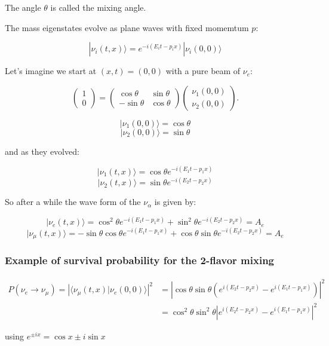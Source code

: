 \documentclass[
  letterpaper,
  DIV=11,
  numbers=noendperiod]{scrreprt}
\begin{document}
The angle \(\theta\) is called the mixing angle.

The mass eigenstates evolve as plane waves with fixed momemtum \(p\):

\[|\nu_{i}(t, x)\rangle = e^{ -i (E_{i} t - p_i x) }|\nu_{i}(0,0)\rangle\]

Let's imagine we start at \((x,t) = (0,0)\) with a pure beam of
\(\nu_e\):

\[\begin{pmatrix} 1 \\ 0 \end{pmatrix} = \begin{pmatrix} \cos\theta & \sin\theta \\ -\sin\theta & \cos\theta \end{pmatrix} \begin{pmatrix} \nu_1(0,0) \\ \nu_2(0,0) \end{pmatrix}.\]

\[|\nu_{1}(0,0)\rangle = \cos \theta\]
\[|\nu_{2}(0,0)\rangle = \sin \theta\]

and as they evolved:

\[|\nu_{1}(t,x)\rangle = \cos \theta e^{ -i (E_{1} t - p_1 x)  }\]
\[|\nu_{2}(t,x)\rangle = \sin \theta e^{ -i (E_{2} t - p_2 x) }\]

So after a while the wave form of the \(\nu_\alpha\) is given by:

\[|\nu_{e}(t, x)\rangle = \cos^2 \theta e^{ -i (E_{1} t - p_1 x)  } + \sin^2 \theta e^{ -i (E_{2} t - p_2 x) } = A_e\]
\[|\nu_{\mu}(t, x)\rangle = -\sin\theta\cos \theta e^{ -i (E_{1} t - p_1 x)  } + \cos\theta\sin \theta e^{ -i (E_{2} t - p_2 x) } = A_e\]

\subsubsection{Example of survival probability for the 2-flavor
mixing}\label{example-of-survival-probability-for-the-2-flavor-mixing}

\[\begin{aligned}
P(\nu_e \rightarrow \nu_\mu) = \left|\langle \nu_{\mu}(t,x)|\nu_{e}(0,0)\rangle\right|^2 &=\left|\cos\theta \sin\theta (e^{i(E_2 t - p_2 x)} - e^{i(E_1 t -p_1 x)})\right|^2\\
&=
\cos^2\theta\sin^2\theta \left|e^{i(E_2 t - p_2 x)} - e^{i(E_1 t -p_1 x)}\right|^2
\end{aligned}
\]

using \(e^{\pm ix} = \cos x \pm i\sin x\)
\end{document}
